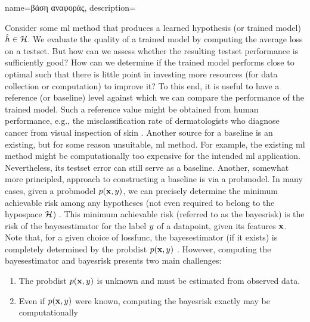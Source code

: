 {name={\foreignlanguage{greek}{βάση αναφοράς}},
    description={Consider 
	some \gls{ml} method that produces a learned \gls{hypothesis} (or trained \gls{model}) $\hat{h} \in \mathcal{H}$. 
	We evaluate the quality of a trained \gls{model} 
    	by computing the average \gls{loss} on a \gls{testset}. But how can we assess 
    	whether the resulting \gls{testset} performance is sufficiently good? How can we 
    	determine if the trained \gls{model} performs close to optimal such that there is little point 
    	in investing more resources (for \gls{data} collection or computation) to improve it? 
    	To this end, it is useful to have a reference (or baseline) level against which 
    	we can compare the performance of the trained \gls{model}. Such a reference value 
    	might be obtained from human performance, e.g., the misclassification rate of dermatologists 
   	who diagnose cancer from visual inspection of skin \cite{SkinHumanAI}. Another source for a baseline is an existing, 
    	but for some reason unsuitable, \gls{ml} method. For example, the existing \gls{ml} method 
    	might be computationally too expensive for the intended \gls{ml} application. 
    	Nevertheless, its \gls{testset} error can still serve as a baseline. Another, somewhat more principled, 
    	approach to constructing a baseline is via a \gls{probmodel}. In many cases, given a \gls{probmodel} $p({\bf x},y)$,  
    	we can precisely determine the \gls{minimum} achievable \gls{risk} among any hypotheses
    	(not even required to belong to the \gls{hypospace} $\mathcal{H}$) \cite{LC}. 
    	This \gls{minimum} achievable \gls{risk} (referred to as the \gls{bayesrisk}) is the \gls{risk} 
    	of the \gls{bayesestimator} for the \gls{label} $y$ of a \gls{datapoint}, given
    	its \gls{feature}s ${\bf x}$. Note that, for a given choice of \gls{lossfunc}, the 
    	\gls{bayesestimator} (if it exists) is completely determined by the \gls{probdist} $p({\bf x},y)$ \cite[Ch. 4]{LC}. 
    	However, computing the \gls{bayesestimator} and \gls{bayesrisk} presents two 
    	main challenges:
    	\begin{enumerate}[label=\arabic*)]
    		\item The \gls{probdist} $p({\bf x},y)$ is unknown and must be estimated from observed \gls{data}.
    		\item Even if $p({\bf x},y)$ were known, computing the \gls{bayesrisk} exactly may be computationally 

\end{enumerate}}}
